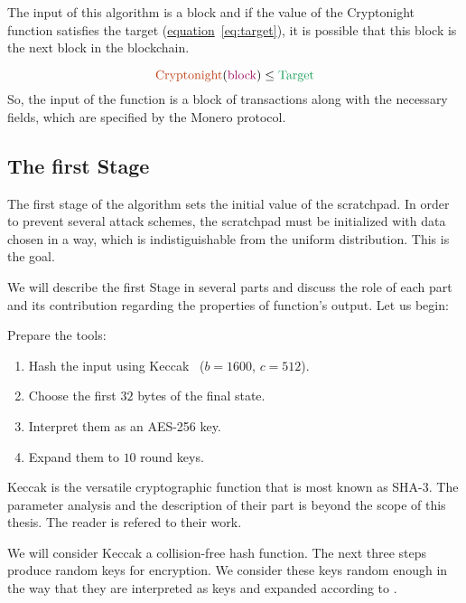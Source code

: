 The input of this algorithm is a block and if the value of the Cryptonight function satisfies the target (\hyperref[eq:target]{equation}~\ref{eq:target}), it is possible that this block is the next block in the blockchain.

\begin{equation}
  \label{eq:target}
  \color{Bittersweet} \mbox{Cryptonight}
  \color{black} (
  \color{RedViolet} \mbox{block}
  \color{black} )\leq
  \color{ForestGreen} \mbox{Target}
  \color{black}
\end{equation}
So, the input of the function is a block of transactions along with the necessary fields, which are specified by the Monero protocol.

\subsection{The first Stage}
The first stage of the algorithm sets the initial value of the scratchpad. In order to prevent several attack schemes, the scratchpad must be initialized with data chosen in a way, which is indistiguishable from the uniform distribution. This is the goal.

We will describe the first Stage in several parts and discuss the role of each part and its contribution regarding the properties of function's output. Let us begin:

\noindent Prepare the tools:
\begin{enumerate}
  \item Hash the input using Keccak~\cite{keccak} ($b=1600$, $c=512$).
  \item Choose the first $32$ bytes of the final state.
  \item Interpret them as an AES-256 key.
  \item Expand them to $10$ round keys.
\end{enumerate}
Keccak is the versatile cryptographic function that is most known as SHA-3. The parameter analysis and the description of their part is beyond the scope of this thesis. The reader is refered to their work.

We will consider Keccak a collision-free hash function. The next three steps produce random keys for encryption. We consider these keys random enough in the way that they are interpreted as keys and expanded according to \cite{nla.cat-vn4183631}.

